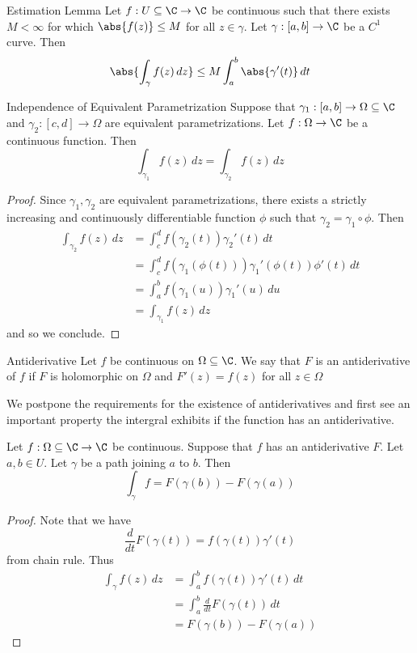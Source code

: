\documentclass[a4paper]{article}
\begin{document}
\begin{lmm}{Estimation Lemma}{} Let $f:U\subseteq\C\to\C$ be continuous such that there exists $M<\infty$ for which $\abs{f(z)}\leq M$ for all $z\in\gamma$. Let $\gamma:[a,b]\to\C$ be a $C^1$ curve. Then $$\abs{\int_{\gamma}f(z)\,dz}\leq M\int_a^b\abs{\gamma'(t)}\,dt$$
\end{lmm}

\begin{prp}{Independence of Equivalent Parametrization}{} Suppose that $\gamma_1:[a,b]\to\Omega\subseteq\C$ and $\gamma_2:[c,d]\to\Omega$ are equivalent parametrizations. Let $f:\Omega\to\C$ be a continuous function. Then $$\int_{\gamma_1}f(z)\,dz=\int_{\gamma_2}f(z)\,dz$$ 
\begin{proof} Since $\gamma_1,\gamma_2$ are equivalent parametrizations, there exists a strictly increasing and continuously differentiable function $\phi$ such that $\gamma_2=\gamma_1\circ\phi$. Then
\begin{align*}
\int_{\gamma_2}f(z)\,dz&=\int_c^df(\gamma_2(t))\gamma_2'(t)\,dt\\
&=\int_c^df(\gamma_1(\phi(t)))\gamma_1'(\phi(t))\phi'(t)\,dt\tag{Let $u=\phi(t)$}\\
&=\int_a^bf(\gamma_1(u))\gamma_1'(u)\,du\\
&=\int_{\gamma_1}f(z)\,dz
\end{align*}
and so we conclude. 
\end{proof}
\end{prp}

\begin{defn}{Antiderivative}{} Let $f$ be continuous on $\Omega\subseteq\C$. We say that $F$ is an antiderivative of $f$ if $F$ is holomorphic on $\Omega$ and $F'(z)=f(z)$ for all $z\in\Omega$
\end{defn}

We postpone the requirements for the existence of antiderivatives and first see an important property the intergral exhibits if the function has an antiderivative. 

\begin{thm}{}{} Let $f:\Omega\subseteq\C\to\C$ be continuous. Suppose that $f$ has an antiderivative $F$. Let $a,b\in U$. Let $\gamma$ be a path joining $a$ to $b$. Then $$\int_{\gamma}f=F(\gamma(b))-F(\gamma(a))$$ 
\begin{proof} Note that we have $$\frac{d}{dt}F(\gamma(t))=f(\gamma(t))\gamma'(t)$$ from chain rule. Thus
\begin{align*}
\int_{\gamma}f(z)\,dz&=\int_a^bf(\gamma(t))\gamma'(t)\,dt\\
&=\int_a^b\frac{d}{dt}F(\gamma(t))\,dt\\
&=F(\gamma(b))-F(\gamma(a))\tag{By the FTC}
\end{align*}
\end{proof}
\end{thm}
\end{document}
